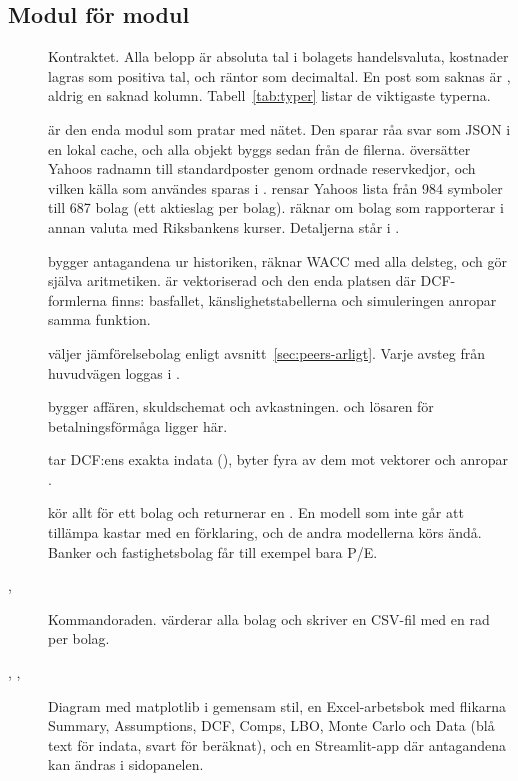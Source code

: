 \subsection{Modul för modul}

\begin{description}
  \item[] Kontraktet. Alla belopp är absoluta tal i bolagets handelsvaluta,
    kostnader lagras som positiva tal, och räntor som decimaltal. En post som saknas är
    , aldrig en saknad kolumn. Tabell~\ref{tab:typer} listar de viktigaste typerna.
  \item[]  är den enda modul som pratar med nätet. Den sparar råa svar
    som JSON i en lokal cache, och alla objekt byggs sedan från de filerna. 
    översätter Yahoos radnamn till standardposter genom ordnade reservkedjor, och vilken källa
    som användes sparas i .  rensar Yahoos lista från 984
    symboler till 687 bolag (ett aktieslag per bolag).  räknar om bolag som
    rapporterar i annan valuta med Riksbankens kurser. Detaljerna står i
    .
  \item[]  bygger antagandena ur historiken,
     räknar WACC med alla delsteg, och  gör själva
    aritmetiken.  är vektoriserad och den enda platsen där DCF-formlerna finns:
    basfallet, känslighetstabellerna och simuleringen anropar samma funktion.
  \item[]  väljer jämförelsebolag enligt
    avsnitt~\ref{sec:peers-arligt}. Varje avsteg från huvudvägen loggas i
    .
  \item[]  bygger affären, skuldschemat och avkastningen.
     och lösaren för betalningsförmåga ligger här.
  \item[]  tar DCF:ens exakta indata
    (), byter fyra av dem mot vektorer och anropar .
  \item[]  kör allt för ett bolag och returnerar
    en . En modell som inte går att tillämpa kastar
     med en förklaring, och de andra modellerna körs ändå. Banker och
    fastighetsbolag får till exempel bara P/E.
  \item[, ] Kommandoraden.  värderar alla
    bolag och skriver en CSV-fil med en rad per bolag.
  \item[, , ] Diagram med matplotlib i gemensam stil,
    en Excel-arbetsbok med flikarna Summary, Assumptions, DCF, Comps, LBO, Monte Carlo och
    Data (blå text för indata, svart för beräknat), och en Streamlit-app där antagandena kan
    ändras i sidopanelen.
\end{description}

